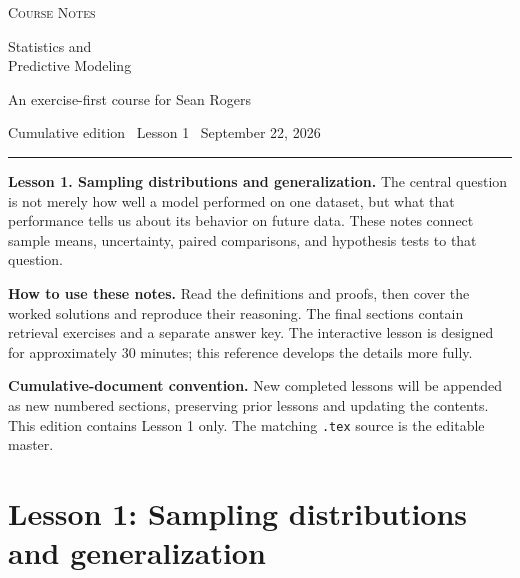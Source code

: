 \documentclass[11pt,letterpaper]{article}
\theoremstyle{definition}
\theoremstyle{remark}
\numberwithin{equation}{section}
\begin{document}
\thispagestyle{empty}
\begin{center}
{\Large\scshape Course Notes}\par\vspace{0.3in}
{\Huge Statistics and\\[6pt] Predictive Modeling}\par\vspace{0.2in}
{\large An exercise-first course for Sean Rogers}\par
\vspace{0.15in}
{\normalsize Cumulative edition \textbullet\ Lesson 1 \textbullet\ September 22, 2026}
\end{center}
\vspace{0.15in}
\hrule
\vspace{0.12in}
\textbf{Lesson 1. Sampling distributions and generalization.}
The central question is not merely how well a model performed on one dataset,
but what that performance tells us about its behavior on future data.
These notes connect sample means, uncertainty, paired comparisons, and hypothesis
tests to that question.

\textbf{How to use these notes.} Read the definitions and proofs, then cover the
worked solutions and reproduce their reasoning. The final sections contain
retrieval exercises and a separate answer key. The interactive lesson is designed
for approximately 30 minutes; this reference develops the details more fully.

\tableofcontents
\vfill
\textbf{Cumulative-document convention.} New completed lessons will be appended
as new numbered sections, preserving prior lessons and updating the contents.
This edition contains Lesson 1 only. The matching \texttt{.tex} source is the
editable master.
\newpage

\section{Lesson 1: Sampling distributions and generalization}
\end{document}
